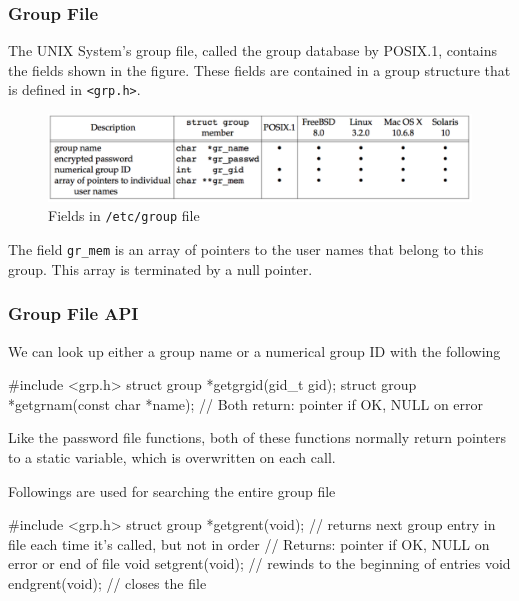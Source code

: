 \documentclass[newPxFont,sthlmFooter,nooffset]{beamer}
\begin{document}
\begin{frame}[t]
  \frametitle{Group File}
The UNIX System’s group file, called the group database by POSIX.1, contains the fields shown in the figure. These fields are contained in a group structure that is defined in \texttt{<grp.h>}.



\begin{figure}[h]
  \centering
  \includegraphics[width=\textwidth]{figure/fig6-4_group.png}
  \caption{Fields in \texttt{/etc/group} file}
\end{figure}

The field \texttt{gr\_mem} is an array of pointers to the user names that belong to this group. This array is terminated by a null pointer.

\end{frame}



\begin{frame}[containsverbatim,t]
  \frametitle{Group File API}

We can look up either a group name or a numerical group ID with the following

\begin{codedef}
#include <grp.h>
struct group *getgrgid(gid_t gid);
struct group *getgrnam(const char *name);
// Both return: pointer if OK, NULL on error
\end{codedef}

Like the password file functions, both of these functions normally return pointers to a static variable, which is overwritten on each call.

Followings are used for searching the entire group file
\begin{codedef}
#include <grp.h>
struct group *getgrent(void);  // returns next group entry in file each time it's called, but not in order
// Returns: pointer if OK, NULL on error or end of file
void setgrent(void);  // rewinds to the beginning of entries
void endgrent(void);  // closes the file
\end{codedef}


\end{frame}
\end{document}
